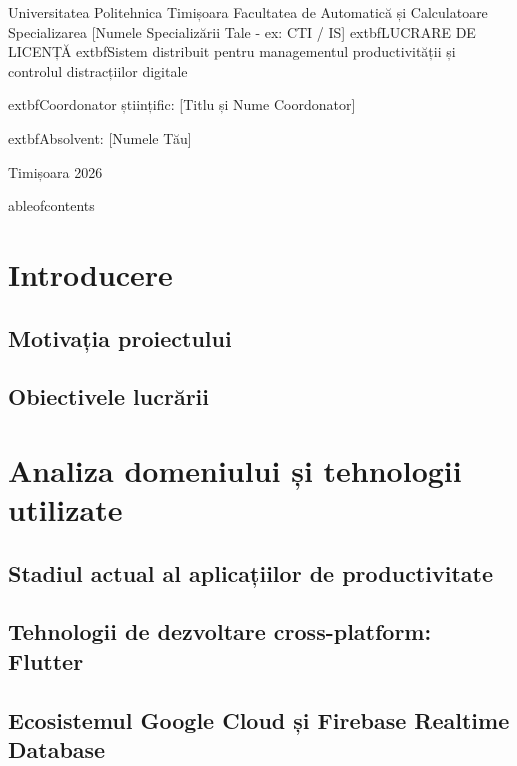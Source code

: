 \documentclass[12pt,a4paper,oneside]{report}
\author{Numele Tău}
\date{Iunie 2026}
\begin{document}
\begin{titlepage}
    \begin{center}
        \large Universitatea Politehnica Timișoara 
        Facultatea de Automatică și Calculatoare 
        Specializarea [Numele Specializării Tale - ex: CTI / IS] 
        \vfill
        \Huge 	extbf{LUCRARE DE LICENȚĂ} 
        \vspace{1cm}
        \Large 	extbf{Sistem distribuit pentru managementul productivității și controlul distracțiilor digitale} 
        \vfill
        \begin{flushleft}
            \large 	extbf{Coordonator științific:} 
            [Titlu și Nume Coordonator]
        \end{flushleft}
        \begin{flushright}
            \large 	extbf{Absolvent:} 
            [Numele Tău]
        \end{flushright}
        \vfill
        \large Timișoara 
        2026
    \end{center}
\end{titlepage}

	ableofcontents

\chapter{Introducere}
\section{Motivația proiectului}
\section{Obiectivele lucrării}

\chapter{Analiza domeniului și tehnologii utilizate}
\section{Stadiul actual al aplicațiilor de productivitate}
\section{Tehnologii de dezvoltare cross-platform: Flutter}
\section{Ecosistemul Google Cloud și Firebase Realtime Database}
\end{document}
